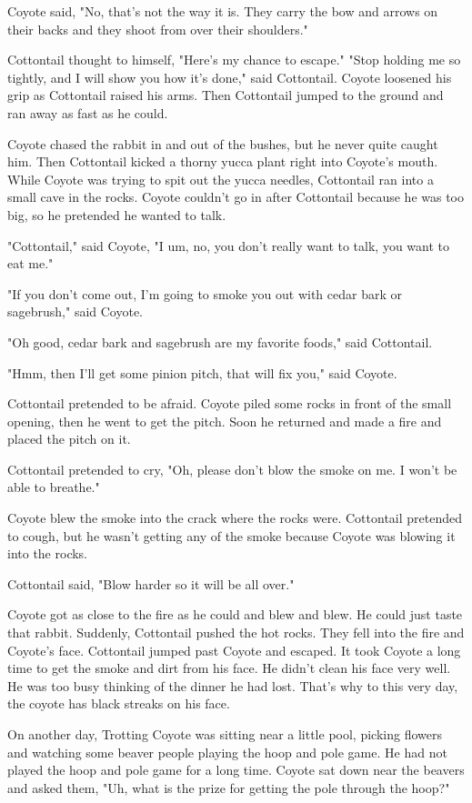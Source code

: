 Coyote said, "No, that's not the way it is. They carry the bow and arrows on their backs and they shoot from over their shoulders."

Cottontail thought to himself, "Here's my chance to escape." "Stop holding me so tightly, and I will show you how it's done," said Cottontail. Coyote loosened his grip as Cottontail raised his arms. Then Cottontail jumped to the ground and ran away as fast as he could.

Coyote chased the rabbit in and out of the bushes, but he never quite caught him. Then Cottontail kicked a thorny yucca plant right into Coyote's mouth. While Coyote was trying to spit out the yucca needles, Cottontail ran into a small cave in the rocks. Coyote couldn't go in after Cottontail because he was too big, so he pretended he wanted to talk.

"Cottontail," said Coyote, "I um, no, you don't really want to talk, you want to eat me."

"If you don't come out, I'm going to smoke you out with cedar bark or sagebrush," said Coyote.

"Oh good, cedar bark and sagebrush are my favorite foods," said Cottontail.

"Hmm, then I'll get some pinion pitch, that will fix you," said Coyote.

Cottontail pretended to be afraid. Coyote piled some rocks in front of the small opening, then he went to get the pitch. Soon he returned and made a fire and placed the pitch on it.

Cottontail pretended to cry, "Oh, please don't blow the smoke on me. I won't be able to breathe."

Coyote blew the smoke into the crack where the rocks were. Cottontail pretended to cough, but he wasn't getting any of the smoke because Coyote was blowing it into the rocks.

Cottontail said, "Blow harder so it will be all over."

Coyote got as close to the fire as he could and blew and blew. He could just taste that rabbit. Suddenly, Cottontail pushed the hot rocks. They fell into the fire and Coyote's face. Cottontail jumped past Coyote and escaped. It took Coyote a long time to get the smoke and dirt from his face. He didn't clean his face very well. He was too busy thinking of the dinner he had lost. That's why to this very day, the coyote has black streaks on his face.

On another day, Trotting Coyote was sitting near a little pool, picking flowers and watching some beaver people playing the hoop and pole game. He had not played the hoop and pole game for a long time. Coyote sat down near the beavers and asked them, "Uh, what is the prize for getting the pole through the hoop?"

